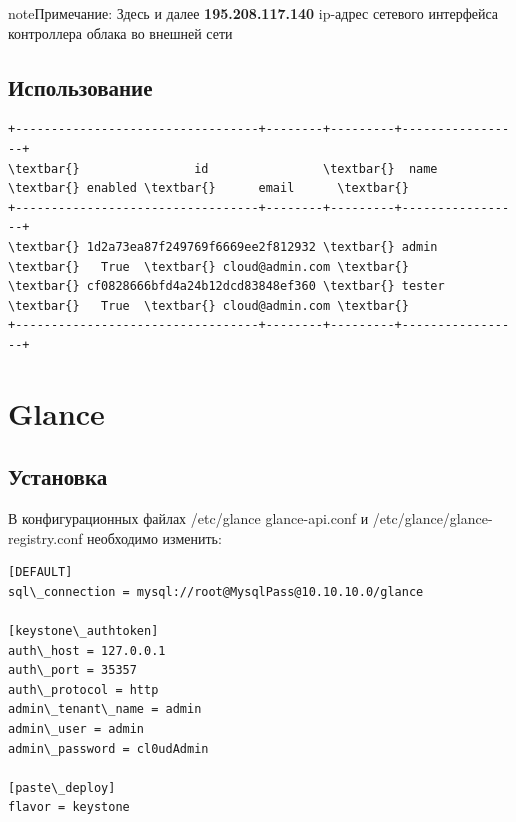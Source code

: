 \documentclass[letterpaper,10pt,russian]{sphinxmanual}
\begin{document}
\begin{notice}{note}{Примечание:}
Здесь и далее \textbf{195.208.117.140} ip-адрес сетевого интерфейса контроллера облака во внешней сети
\end{notice}


\section{Использование}
\label{README:id9}

\begin{Verbatim}[commandchars=\\\{\}]
+----------------------------------+--------+---------+-----------------+
\textbar{}                id                \textbar{}  name  \textbar{} enabled \textbar{}      email      \textbar{}
+----------------------------------+--------+---------+-----------------+
\textbar{} 1d2a73ea87f249769f6669ee2f812932 \textbar{} admin  \textbar{}   True  \textbar{} cloud@admin.com \textbar{}
\textbar{} cf0828666bfd4a24b12dcd83848ef360 \textbar{} tester \textbar{}   True  \textbar{} cloud@admin.com \textbar{}
+----------------------------------+--------+---------+-----------------+
\end{Verbatim}


\chapter{Glance}
\label{README:id10}\label{README:glance}

\section{Установка}
\label{README:id11}


В конфигурационных файлах /etc/glance glance-api.conf и /etc/glance/glance-registry.conf необходимо изменить:

\begin{Verbatim}[commandchars=\\\{\}]
[DEFAULT]
sql\_connection = mysql://root@MysqlPass@10.10.10.0/glance

[keystone\_authtoken]
auth\_host = 127.0.0.1
auth\_port = 35357
auth\_protocol = http
admin\_tenant\_name = admin
admin\_user = admin
admin\_password = cl0udAdmin

[paste\_deploy]
flavor = keystone
\end{Verbatim}
\end{document}
